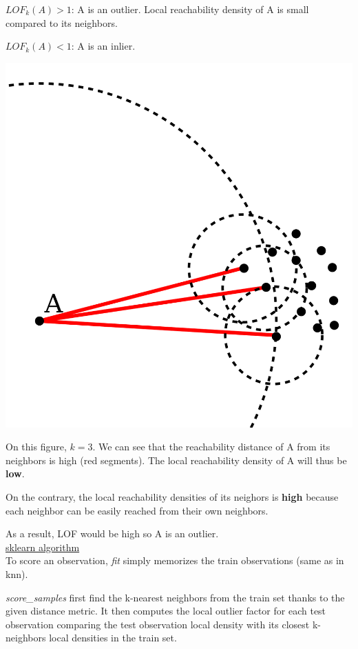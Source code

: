 $LOF_k(A) > 1$: A is an outlier. Local reachability density of A is small compared to its neighbors.

$LOF_k(A) < 1$: A is an inlier.

\begin{center}
\includegraphics[scale=0.10]{LOF.png}
\end{center}

On this figure, $k = 3$. We can see that the reachability distance of A from its neighbors is high (red segments). The local reachability density of A will thus be \textbf{low}.

On the contrary, the local reachability densities of its neighors is \textbf{high} because each neighbor can be easily reached from their own neighbors.

As a result, LOF would be high so A is an outlier. \\

\underline{sklearn algorithm} \\

To score an observation, \textit{fit} simply memorizes the train observations (same as in knn). 

\textit{score\_samples} first find the k-nearest neighbors from the train set thanks to the given distance metric. It then computes the local outlier factor for each test observation comparing the test observation local density with its closest k-neighbors local densities in the train set.

\vspace{5mm}